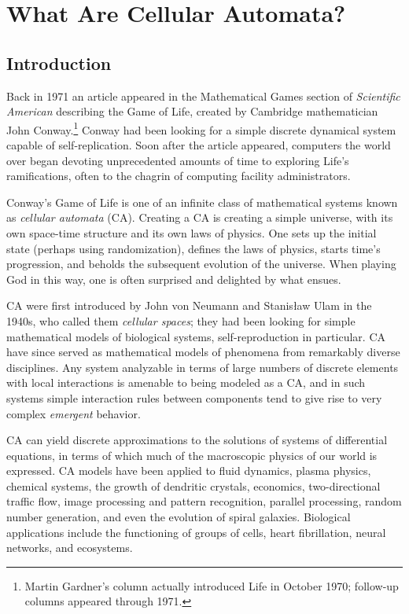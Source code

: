 \chapter{What Are Cellular Automata?}

\section{Introduction}

Back in 1971 an article appeared in the Mathematical Games section of
\emph{Scientific American} describing the Game of Life, created by
Cambridge mathematician John Conway.\footnote{Martin Gardner's column
actually introduced Life in October 1970; follow-up columns appeared
through 1971.}  Conway had been looking for a simple discrete dynamical
system capable of self-replication.  Soon after the article appeared,
computers the world over began devoting unprecedented amounts of time
to exploring Life's ramifications, often to the chagrin of computing
facility administrators.

Conway's Game of Life is one of an infinite class of mathematical
systems known as \emph{cellular automata} (CA).  Creating a CA is
creating a simple universe, with its own space-time structure and its
own laws of physics.  One sets up the initial state (perhaps using
randomization), defines the laws of physics, starts time's progression,
and beholds the subsequent evolution of the universe.  When playing God
in this way, one is often surprised and delighted by what ensues.

CA were first introduced by John von Neumann and Stanis\l{}aw Ulam in
the 1940s, who called them \emph{cellular spaces}; they had been
looking for simple mathematical models of biological systems,
self-reproduction in particular.  CA have since served as mathematical
models of phenomena from remarkably diverse disciplines.  Any system
analyzable in terms of large numbers of discrete elements with local
interactions is amenable to being modeled as a CA, and in such systems
simple interaction rules between components tend to give rise to very
complex \emph{emergent} behavior.

CA can yield discrete approximations to the solutions of systems of
differential equations, in terms of which much of the macroscopic
physics of our world is expressed.  CA models have been applied to
fluid dynamics, plasma physics, chemical systems, the growth of
dendritic crystals, economics, two-directional traffic flow, image
processing and pattern recognition, parallel processing, random number
generation, and even the evolution of spiral galaxies.  Biological
applications include the functioning of groups of cells, heart
fibrillation, neural networks, and ecosystems.

